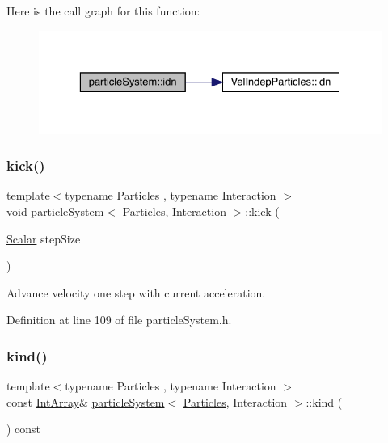 Here is the call graph for this function\+:\nopagebreak
\begin{figure}[H]
\begin{center}
\leavevmode
\includegraphics[width=329pt]{classparticle_system_a1d809808c2eaeeaa2e58b8fcf0aa5789_cgraph}
\end{center}
\end{figure}
\mbox{\label{classparticle_system_abda10b9f9dc5ea55a2d9fdf7f9d76d8d}} 
\subsubsection{\texorpdfstring{kick()}{kick()}}
{\footnotesize\ttfamily template$<$typename Particles , typename Interaction $>$ \\
void \mbox{\hyperlink{classparticle_system}{particle\+System}}$<$ \mbox{\hyperlink{struct_particles}{Particles}}, Interaction $>$\+::kick (\begin{DoxyParamCaption}\item[{\mbox{\hyperlink{classparticle_system_a3938954186247e3eab01cc75fcc62b40}{Scalar}}}]{step\+Size }\end{DoxyParamCaption})\hspace{0.3cm}{\ttfamily [inline]}}



Advance velocity one step with current acceleration. 



Definition at line 109 of file particle\+System.\+h.

\mbox{\label{classparticle_system_a5b41ae458724a13976117216fdf63b19}} 
\subsubsection{\texorpdfstring{kind()}{kind()}\hspace{0.1cm}{\footnotesize\ttfamily [1/2]}}
{\footnotesize\ttfamily template$<$typename Particles , typename Interaction $>$ \\
const \mbox{\hyperlink{classparticle_system_aea9c70dc1a9d1947b425f5383fb21e24}{Int\+Array}}\& \mbox{\hyperlink{classparticle_system}{particle\+System}}$<$ \mbox{\hyperlink{struct_particles}{Particles}}, Interaction $>$\+::kind (\begin{DoxyParamCaption}{ }\end{DoxyParamCaption}) const\hspace{0.3cm}{\ttfamily [inline]}}



